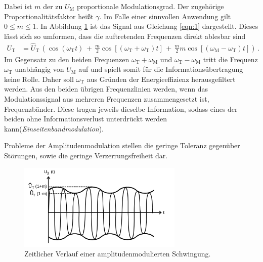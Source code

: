 Dabei ist $m$ der zu $U_{\text{M}}$ proportionale Modulationsgrad.
Der zugehörige Proportionalitätsfaktor heißt $\gamma$.
Im Falle einer sinnvollen Anwendung gilt $0 \leq m \leq 1$.
In Abbildung \ref{fig:amplitudenmodulation_1} ist das Signal aus Gleichung
\eqref{eqn:1} dargestellt.
Dieses lässt sich so umformen, dass die auftretenden Frequenzen direkt
ablesbar sind
\begin{align}
\label{eqn:2}
U_{\text{T}} &= \hat{U}_{\text{T}} \, \left( \cos(\omega_{\text{T}} t) \, + \, \frac{m}{2} \cos\left[\left( \omega_{\text{T}} + \omega_{\text{T}} \right)t \right] \,
+ \, \frac{m}{2} m \cos \left[ \left( \omega_{\text{M}} - \omega_{\text{T}} \right)t\right]\right) \, .
\end{align}
Im Gegensatz zu den beiden Frequenzen $\omega_{\text{T}} + \omega_{\text{M}}$ und $\omega_{\text{T}} - \omega_{\text{M}}$ tritt die Frequenz $\omega_{\text{T}}$
unabhängig von $U_{\text{M}}$ auf und spielt somit
für die Informationsübertragung keine Rolle. Daher soll $\omega_{\text{T}}$
aus Gründen der Energieeffizienz herausgefiltert werden.
Aus den beiden übrigen Frequenzlinien werden, wenn das Modulationssignal
aus mehreren Frequenzen zusammengesetzt ist, Frequenzbänder.
Diese tragen jeweils dieselbe Information, sodass eines der beiden ohne
Informationsverlust unterdrückt werden kann(\textit{Einseitenbandmodulation}).

Probleme der Amplitudenmodulation stellen die geringe Toleranz gegenüber
Störungen, sowie die geringe Verzerrungsfreiheit dar.

\begin{figure}
\centering
\includegraphics[width=0.7\textwidth]{figures/amplitudenmodulation.PNG}
\caption{Zeitlicher Verlauf einer amplitudenmodulierten Schwingung.\cite{sample}}
\label{fig:amplitudenmodulation_1}
\end{figure}

